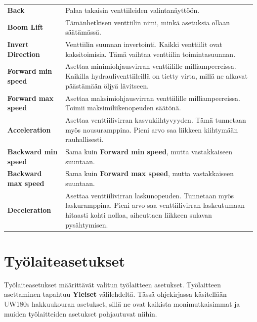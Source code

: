 \documentclass[12pt,a4paper,finnish]{uvmanual}
\begin{document}
\begin{tabular}{ L{0.2\textwidth} L{0.66\textwidth} }
\textbf{Back} & Palaa takaisin venttiileiden valintanäyttöön. \\
\textbf{Boom Lift} & Tämänhetkisen venttiilin nimi, minkä asetuksia ollaan säätämässä. \\
\textbf{Invert Direction} & Venttiilin suunnan invertointi. Kaikki venttiilit ovat kaksitoimisia. Tämä vaihtaa venttiilin toimintasuunnan. \\
\textbf{Forward min speed} & Asettaa minimiohjausvirran venttiilille milliampeereissa. Kaikilla hydrauliventtiileillä on tietty virta, millä ne alkavat päästämään öljyä lävitseen. \\
\textbf{Forward max speed} & Asettaa maksimiohjausvirran venttiilille milliampeereissa. Toimii maksimiliikenopeuden säätönä. \\
\textbf{Acceleration} & Asettaa venttiilivirran kasvukiihtyvyyden. Tämä tunnetaan myös nousuramppina. Pieni arvo saa liikkeen kiihtymään rauhallisesti. \\
\textbf{Backward min speed} & Sama kuin \textbf{Forward min speed}, mutta vastakkaiseen suuntaan. \\
\textbf{Backward max speed} & Sama kuin \textbf{Forward max speed}, mutta vastakkaiseen suuntaan. \\
\textbf{Deceleration} & Asettaa venttiilivirran laskunopeuden. Tunnetaan myös laskuramppina. Pieni arvo saa venttiilivirran laskeutumaan hitaasti kohti nollaa, aiheuttaen liikkeen sulavan pysähtymisen. \\
\end{tabular}



\section{Työlaiteasetukset}\label{ch:settings_implement}

Työlaiteasetukset määrittävät valitun työlaitteen asetukset. Työlaitteen asettaminen tapahtuu \textbf{Yleiset} välilehdeltä. Tässä ohjekirjassa käsitellään UW180s hakkuukouran asetukset, sillä ne ovat kaikista monimutkaisimmat ja muiden työlaitteiden asetukset pohjautuvat niihin.
\end{document}
